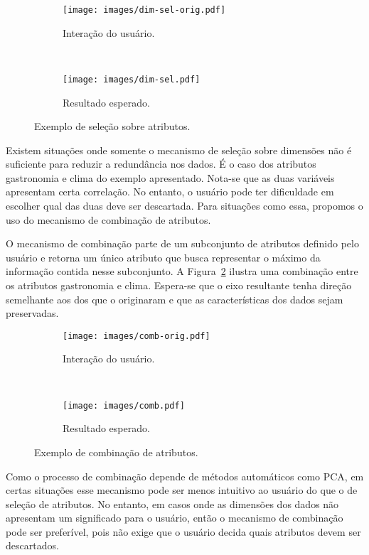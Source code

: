 \begin{figure}[h!]
  \centering
  \begin{subfigure}[b]{0.45\textwidth}
    \centering
    \texttt{[image: images/dim-sel-orig.pdf]}
    \caption{Interação do usuário.}
  \end{subfigure}%
  ~
  \begin{subfigure}[b]{0.45\textwidth}
    \centering
    \texttt{[image: images/dim-sel.pdf]}
    \caption{Resultado esperado.}
  \end{subfigure} 
  \caption{Exemplo de seleção sobre atributos.}
  \label{fig:item-sel}
\end{figure}

Existem situações onde somente o mecanismo de seleção sobre
dimensões não é suficiente para reduzir a redundância nos
dados. É o caso dos atributos gastronomia e clima do exemplo
apresentado. Nota-se que as duas variáveis apresentam certa
correlação. No entanto, o usuário pode ter dificuldade em
escolher qual das duas deve ser descartada. Para situações
como essa, propomos o uso do mecanismo de combinação de
atributos.

O mecanismo de combinação parte de um subconjunto de atributos
definido pelo usuário e retorna um único atributo que busca
representar o máximo da informação contida nesse subconjunto. A
Figura~\ref{fig:comb} ilustra uma combinação entre os atributos
gastronomia e clima. Espera-se que o eixo resultante tenha
direção semelhante aos dos que o originaram e que as
características dos dados sejam preservadas.

\begin{figure}[h!]
  \centering
  \begin{subfigure}[b]{0.45\textwidth}
    \centering
    \texttt{[image: images/comb-orig.pdf]}
    \caption{Interação do usuário.}
  \end{subfigure}%
  ~
  \begin{subfigure}[b]{0.45\textwidth}
    \centering
    \texttt{[image: images/comb.pdf]}
    \caption{Resultado esperado.}
  \end{subfigure} 
  \caption{Exemplo de combinação de atributos.}
  \label{fig:comb}
\end{figure}

Como o processo de combinação depende de métodos automáticos
como PCA, em certas situações esse mecanismo pode ser menos
intuitivo ao usuário do que o de seleção de atributos. No
entanto, em casos onde as dimensões dos dados não apresentam
um significado para o usuário, então o mecanismo de
combinação pode ser preferível, pois não exige que o usuário
decida quais atributos devem ser descartados.

